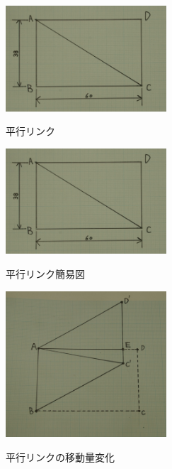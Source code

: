\documentclass[a4paper]{jarticle}
\begin{document}
\begin{figure}[htbt]
 \begin{center}
  \includegraphics[width=60mm]{img/kanizu.jpg}
 　\caption{平行リンク}
  \label{fig:box}%
 \end{center}
\end{figure}



\begin{figure}[htbt]
 \begin{center}
  \includegraphics[width=60mm]{img/kanizu.jpg}
 　\caption{平行リンク簡易図}
  \label{fig:bix}%
 \end{center}
\end{figure}


\begin{figure}[htbt]
 \begin{center}
  \includegraphics[width=60mm]{img/rink.jpg}
 　\caption{平行リンクの移動量変化}
  \label{fig:rink}%
 \end{center}
\end{figure}
\end{document}
